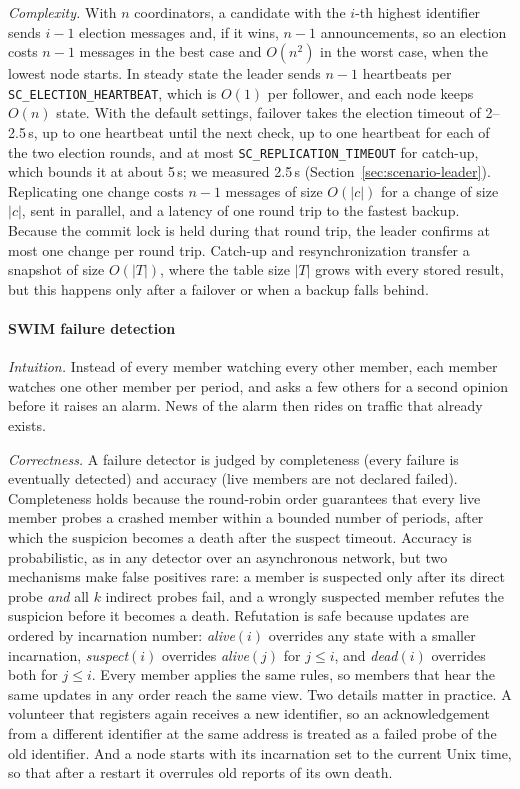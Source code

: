 \emph{Complexity.} With $n$ coordinators, a candidate with the $i$-th highest identifier sends $i-1$ election messages and, if it wins, $n-1$ announcements, so an election costs $n-1$ messages in the best case and $O(n^2)$ in the worst case, when the lowest node starts. In steady state the leader sends $n-1$ heartbeats per \texttt{SC\_ELECTION\_HEARTBEAT}, which is $O(1)$ per follower, and each node keeps $O(n)$ state. With the default settings, failover takes the election timeout of 2--2.5\,s, up to one heartbeat until the next check, up to one heartbeat for each of the two election rounds, and at most \texttt{SC\_REPLICATION\_TIMEOUT} for catch-up, which bounds it at about 5\,s; we measured 2.5\,s (Section~\ref{sec:scenario-leader}). Replicating one change costs $n-1$ messages of size $O(|c|)$ for a change of size $|c|$, sent in parallel, and a latency of one round trip to the fastest backup. Because the commit lock is held during that round trip, the leader confirms at most one change per round trip. Catch-up and resynchronization transfer a snapshot of size $O(|T|)$, where the table size $|T|$ grows with every stored result, but this happens only after a failover or when a backup falls behind.

\paragraph{SWIM failure detection}
\emph{Intuition.} Instead of every member watching every other member, each member watches one other member per period, and asks a few others for a second opinion before it raises an alarm. News of the alarm then rides on traffic that already exists.

\emph{Correctness.} A failure detector is judged by completeness (every failure is eventually detected) and accuracy (live members are not declared failed). Completeness holds because the round-robin order guarantees that every live member probes a crashed member within a bounded number of periods, after which the suspicion becomes a death after the suspect timeout. Accuracy is probabilistic, as in any detector over an asynchronous network, but two mechanisms make false positives rare: a member is suspected only after its direct probe \emph{and} all $k$ indirect probes fail, and a wrongly suspected member refutes the suspicion before it becomes a death. Refutation is safe because updates are ordered by incarnation number: \textit{alive}$(i)$ overrides any state with a smaller incarnation, \textit{suspect}$(i)$ overrides \textit{alive}$(j)$ for $j \le i$, and \textit{dead}$(i)$ overrides both for $j \le i$. Every member applies the same rules, so members that hear the same updates in any order reach the same view. Two details matter in practice. A volunteer that registers again receives a new identifier, so an acknowledgement from a different identifier at the same address is treated as a failed probe of the old identifier. And a node starts with its incarnation set to the current Unix time, so that after a restart it overrules old reports of its own death.


